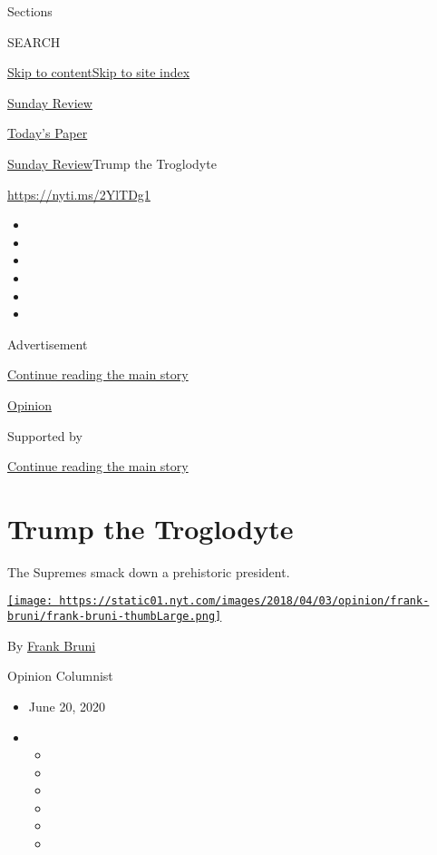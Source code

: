 Sections

SEARCH

\protect\hyperlink{site-content}{Skip to
content}\protect\hyperlink{site-index}{Skip to site index}

\href{https://www.nytimes.com/section/opinion/sunday}{Sunday Review}

\href{https://myaccount.nytimes.com/auth/login?response_type=cookie\&client_id=vi}{}

\href{https://www.nytimes.com/section/todayspaper}{Today's Paper}

\href{/section/opinion/sunday}{Sunday Review}\textbar{}Trump the
Troglodyte

\href{https://nyti.ms/2YlTDg1}{https://nyti.ms/2YlTDg1}

\begin{itemize}
\item
\item
\item
\item
\item
\item
\end{itemize}

Advertisement

\protect\hyperlink{after-top}{Continue reading the main story}

\href{/section/opinion}{Opinion}

Supported by

\protect\hyperlink{after-sponsor}{Continue reading the main story}

\hypertarget{trump-the-troglodyte}{%
\section{Trump the Troglodyte}\label{trump-the-troglodyte}}

The Supremes smack down a prehistoric president.

\href{https://www.nytimes.com/by/frank-bruni}{\texttt{[image: https://static01.nyt.com/images/2018/04/03/opinion/frank-bruni/frank-bruni-thumbLarge.png]}}

By \href{https://www.nytimes.com/by/frank-bruni}{Frank Bruni}

Opinion Columnist

\begin{itemize}
\item
  June 20, 2020
\item
  \begin{itemize}
  \item
  \item
  \item
  \item
  \item
  \item
  \end{itemize}
\end{itemize}

